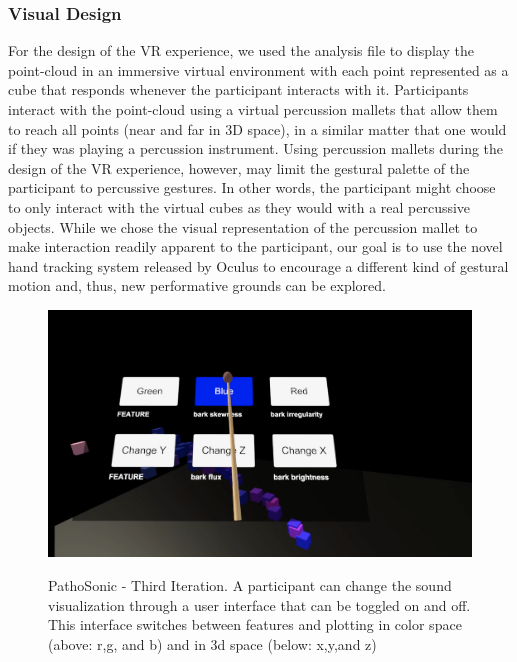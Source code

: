 \documentclass{nime-alternate}
\begin{document}
\subsubsection{Visual Design}

For the design of the VR experience, we used the analysis file to display the point-cloud in an immersive virtual environment with each point represented as a cube that responds whenever the participant interacts with it. Participants interact with the point-cloud using a virtual percussion mallets that allow them to reach all points (near and far in 3D space), in a similar matter that one would if they was playing a percussion instrument. Using percussion mallets during the design of the VR experience, however, may limit the gestural palette of the participant to percussive gestures. In other words, the participant might choose to only interact with the virtual cubes as they would with a real percussive objects. While we chose the visual representation of the percussion mallet to make interaction readily apparent to the participant, our goal is to use the novel hand tracking system released by Oculus to encourage a different kind of gestural motion and, thus, new performative grounds can be explored. 

\begin{figure}[htbp]
       \centering
              \includegraphics[width=1\textwidth]{pathosonic3.jpg}
       \label{PathoSonic - Third Iteration. A participant can change the sound visualization through a user interface that can be toggled on and off. This interface switches between features and plotting in color space (above: r,g, and b) and in 3d space (below: x,y,and z)}
       \caption{PathoSonic - Third Iteration. A participant can change the sound visualization through a user interface that can be toggled on and off. This interface switches between features and plotting in color space (above: r,g, and b) and in 3d space (below: x,y,and z)}
\end{figure}
\end{document}
